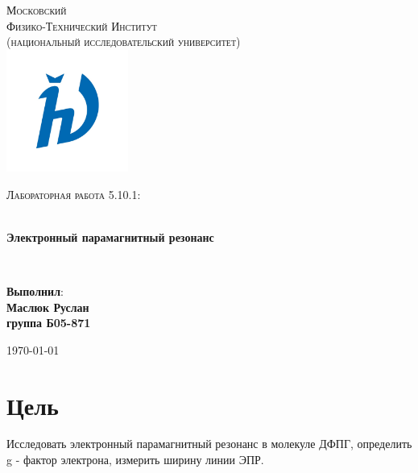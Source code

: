 \documentclass[14pt, a4paper]{extarticle}
\begin{document}


\begin{titlepage}
\begin{center}

\textsc{\LARGE Московский\\[-0.2cm]Физико-Технический Институт\\[0.1cm]\large (национальный исследовательский университет)}\\[1.5cm] 

\includegraphics[width=0.3\textwidth]{logo}

\textsc{\Large Лабораторная работа 5.10.1: \\ }

\HRule \\[0.4cm]
{ \LARGE \bfseries Электронный парамагнитный резонанс }

\HRule \\[1.5cm]

\noindent
\begin{minipage}{0.4\textwidth}
\begin{flushleft} \large
\end{flushleft}
\end{minipage}%
\begin{minipage}{0.4\textwidth}
\begin{flushright} \large
\end{flushright}
\end{minipage}

\large{\begin{flushright}
\vfill
\textbf{Выполнил}:\\
\textbf{Маслюк Руслан\\}
\textbf{группа Б05-871}
\end{flushright}}

{\large \today}\\

\end{center}
\end{titlepage}

\section{Цель}
\label{sec:цель}
Исследовать электронный парамагнитный резонанс в молекуле ДФПГ, определить g - фактор электрона, измерить ширину линии ЭПР.
\end{document}
